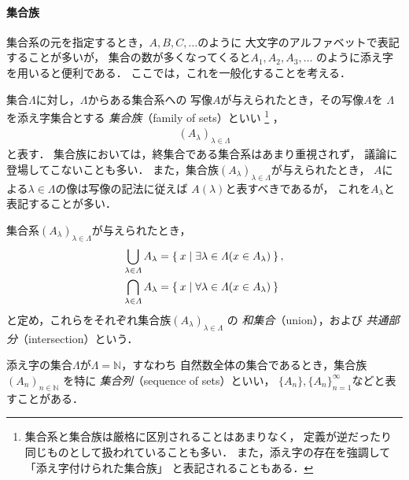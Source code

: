    \paragraph{集合族}
    集合系の元を指定するとき，$A,  B,  C,  \ldots$のように
    大文字のアルファベットで表記することが多いが，
    集合の数が多くなってくると$A_1,  A_2,  A_3 ,  \ldots$
    のように添え字を用いると便利である．
    ここでは，これを一般化することを考える．

    集合$\varLambda$に対し，$\varLambda$からある集合系への
    写像$A$が与えられたとき，その写像$A$を
    $\varLambda$を添え字集合とする
    \emph{集合族}（family of sets）といい
    \footnote{集合系と集合族は厳格に区別されることはあまりなく，
    定義が逆だったり同じものとして扱われていることも多い．
    また，添え字の存在を強調して「添え字付けられた集合族」
    と表記されることもある．}
    ，
    \begin{align}
      (A_\lambda)_{\lambda \in \varLambda}
      \label{eq:famiryset}
    \end{align}
    と表す．
    集合族においては，終集合である集合系はあまり重視されず，
    議論に登場してこないことも多い．
    また，集合族$(A_\lambda)_{\lambda \in \varLambda}$が与えられたとき，
    $A$による$\lambda \in \varLambda$の像は写像の記法に従えば
    $A(\lambda)$と表すべきであるが，
    これを$A_\lambda$と表記することが多い．
    
    集合系$(A_\lambda)_{\lambda \in \varLambda}$が与えられたとき，
    \begin{align}
      \bigcup_{\lambda \in \varLambda} A_\lambda & = 
      \Set{ x \mid \exists \lambda \in \varLambda ( x \in A_\lambda) }, 
      \label{eq:famirysetcup} \\
      \bigcap_{\lambda \in \varLambda} A_\lambda & = 
      \Set{ x \mid \forall \lambda \in \varLambda ( x \in A_\lambda) }
      \label{eq:famirysetcap}
    \end{align}
    と定め，これらをそれぞれ集合族$(A_\lambda)_{\lambda \in \varLambda}$
    の
    \emph{和集合}（union），および
    \emph{共通部分}（intersection）という．

    添え字の集合$\varLambda$が$\varLambda = \mathbb{N}$，すなわち
    自然数全体の集合であるとき，集合族$(A_n)_{n \in \mathbb{N}}$
    を特に
    \emph{集合列}（sequence of sets）といい，
    $\{A_n \},  \{ A_n \} _{n=1}^{\infty}$などと表すことがある．
    
